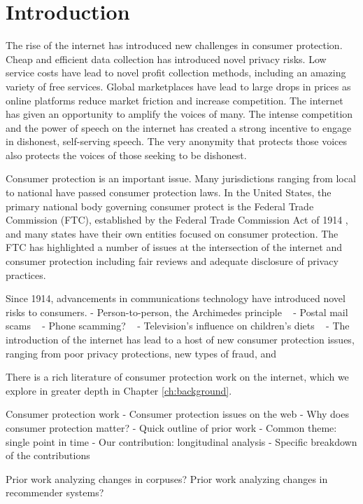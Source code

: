 \chapter{Introduction} \label{ch:introduction}

The rise of the internet has introduced new challenges in consumer protection. Cheap and efficient data collection has introduced novel privacy risks. Low service costs have lead to novel profit collection methods, including an amazing variety of free services. Global marketplaces have lead to large drops in prices as online platforms reduce market friction and increase competition. The internet has given an opportunity to amplify the voices of many. The intense competition and the power of speech on the internet has created a strong incentive to engage in dishonest, self-serving speech. The very anonymity that protects those voices also protects the voices of those seeking to be dishonest.

Consumer protection is an important issue. Many jurisdictions ranging from local to national have passed consumer protection laws. In the United States, the primary national body governing consumer protect is the Federal Trade Commission (FTC), established by the Federal Trade Commission Act of 1914 , and many states have their own entities focused on consumer protection. The FTC has highlighted a number of issues at the intersection of the internet and consumer protection including fair reviews and adequate disclosure of privacy practices.

Since 1914, advancements in communications technology have introduced novel risks to consumers. 
- Person-to-person, the Archimedes principle ~\cite{thompson2008archimedes}
- Postal mail scams ~\cite{uspismailfraud}
- Phone scamming? ~\cite{ftcphonescams}
- Television's influence on children's diets ~\cite{morton1985television}
- The introduction of the internet has lead to a host of new consumer protection issues, ranging from poor privacy protections, new types of fraud, and 

There is a rich literature of consumer protection work on the internet, which we explore in greater depth in Chapter \ref{ch:background}.

Consumer protection work
- Consumer protection issues on the web
- Why does consumer protection matter?
- Quick outline of prior work
- Common theme: single point in time
- Our contribution: longitudinal analysis
- Specific breakdown of the contributions

Prior work analyzing changes in corpuses? Prior work analyzing changes in recommender systems?



